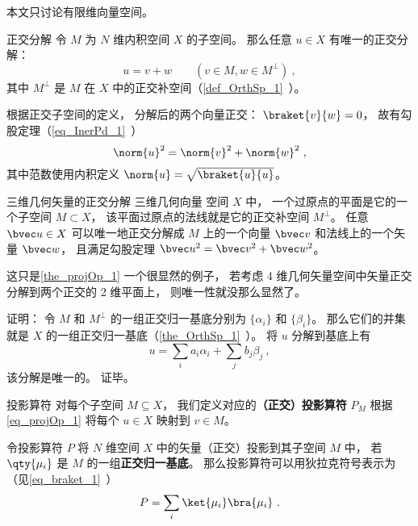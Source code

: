 

本文只讨论有限维向量空间。

\begin{theorem}{正交分解}\label{the_projOp_1}
令 $M$ 为 $N$ 维内积空间 $X$ 的子空间。 那么任意 $u\in X$ 有唯一的正交分解：
\begin{equation}\label{eq_projOp_1}
u = v + w \qquad (v\in M, w\in M^\bot)~,
\end{equation}
其中 $M^\bot$ 是 $M$ 在 $X$ 中的正交补空间（\autoref{def_OrthSp_1}~）。
\end{theorem}
根据正交子空间的定义， 分解后的两个向量正交： $\braket{v}{w} = 0$， 故有勾股定理（\autoref{eq_InerPd_1}~）
\begin{equation}
\norm{u}^2 = \norm{v}^2 + \norm{w}^2~,
\end{equation}
其中范数使用内积定义 $\norm{u} = \sqrt{\braket{u}{u}}$。

\begin{example}{三维几何矢量的正交分解}
三维几何向量 空间 $X$ 中， 一个过原点的平面是它的一个子空间 $M \subset X$， 该平面过原点的法线就是它的正交补空间 $M^\bot$。  任意 $\bvec u \in X$ 可以唯一地正交分解成 $M$ 上的一个向量 $\bvec v$ 和法线上的一个矢量 $\bvec w$， 且满足勾股定理 $\bvec u^2 = \bvec v^2 + \bvec w^2$。

这只是\autoref{the_projOp_1} 一个很显然的例子， 若考虑 4 维几何矢量空间中矢量正交分解到两个正交的 2 维平面上， 则唯一性就没那么显然了。
\end{example}

证明： 令 $M$ 和 $M^\bot$ 的一组正交归一基底分别为 $\{\alpha_i\}$ 和 $\{\beta_i\}$。 那么它们的并集就是 $X$ 的一组正交归一基底（\autoref{the_OrthSp_1}~）。 将 $u$ 分解到基底上有
\begin{equation}
u = \sum_i a_i \alpha_i + \sum_j b_j \beta_j~,
\end{equation}
该分解是唯一的。 证毕。

\begin{definition}{投影算符}
对每个子空间 $M\subseteq X$， 我们定义对应的\textbf{（正交）投影算符} $P_M$ 根据\autoref{eq_projOp_1} 将每个 $u\in X$ 映射到 $v\in M$。
\end{definition}

\begin{theorem}{}
令投影算符 $P$ 将 $N$ 维空间 $X$ 中的矢量（正交）投影到其子空间 $M$ 中， 若 $\qty{\mu_i}$ 是 $M$ 的一组\textbf{正交归一基底}。 那么投影算符可以用狄拉克符号表示为（见\autoref{eq_braket_1}~）
\begin{equation}
P = \sum_i \ket{\mu_i}\bra{\mu_i}~.
\end{equation}
\end{theorem}



